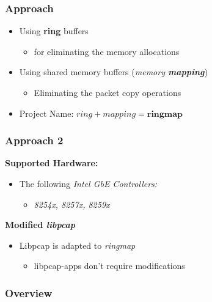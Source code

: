 \begin{frame}
\frametitle{Approach}
\begin{itemize}
	\item<1-> Using \textbf{ring} buffers
		\begin{itemize}
			\item<1-> for eliminating the memory allocations
		\end{itemize}

	\item<2-> Using shared memory buffers (\emph{memory \textbf{mapping}})
		\begin{itemize}
			\item<2-> Eliminating the packet copy operations				
		\end{itemize}
	\item<3->[$\Rightarrow$] Project Name: $ring + mapping = \textbf{ringmap}$
\end{itemize}
\end{frame}


\begin{frame}
\frametitle{Approach 2}
\textbf{Supported Hardware:}
\begin{itemize}
	\item The following \emph{Intel GbE Controllers:}
		\begin{itemize}
			\item \small{\emph{8254x, 8257x, 8259x}}\newline
		\end{itemize}
\end{itemize}

\textbf{Modified \emph{libpcap}}
\begin{itemize}
	\item Libpcap is adapted to \emph{ringmap}
	\begin{itemize}
		\item libpcap-apps don't require modifications\newline
	\end{itemize}
\end{itemize}
\end{frame}

\begin{frame}
\frametitle{Overview}

\end{frame}

